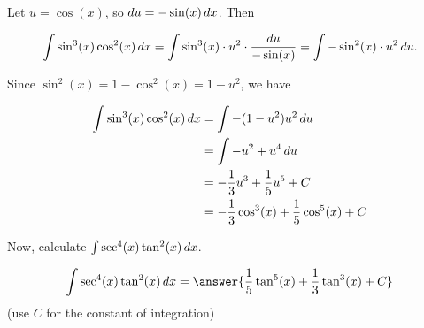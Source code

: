 \documentclass{ximera}
\begin{document}
\begin{exercise}
\begin{exercise}
\begin{example}
\begin{explanation}
Let $u = \cos(x)$, so $\mathop{}\!d u = - \sin(x) \mathop{}\!d x$.  Then

\[
\int \sin^3(x) \cos^2(x) \mathop{}\!d x = \int \sin^3(x) \cdot u^2 \cdot  \frac{\mathop{}\!d u}{-\sin(x)} = \int -\sin^2(x) \cdot u^2 \mathop{}\!d u.
\]

Since $\sin^2(x) = 1-\cos^2(x) = 1-u^2$, we have

\begin{align*}
\int \sin^3(x) \cos^2(x) \mathop{}\!d x &=  \int -(1-u^2) u^2 \mathop{}\!d u \\
&= \int -u^2+u^4 \mathop{}\!d u \\
&= -\frac{1}{3}u^3+\frac{1}{5}u^5+C \\
&= -\frac{1}{3}\cos^3(x)+\frac{1}{5}\cos^5(x)+C
\end{align*}

\end{explanation}

\end{example}

Now, calculate $\int \sec^4(x)\tan^2(x) \mathop{}\!d x$.

\[
\int  \sec^4(x)\tan^2(x) \d x= \answer{\frac{1}{5}\tan^5(x)+\frac{1}{3}\tan^3(x)+C}
\] 
(use $C$ for the constant of integration)

\end{exercise}
\end{exercise}
\end{document}
